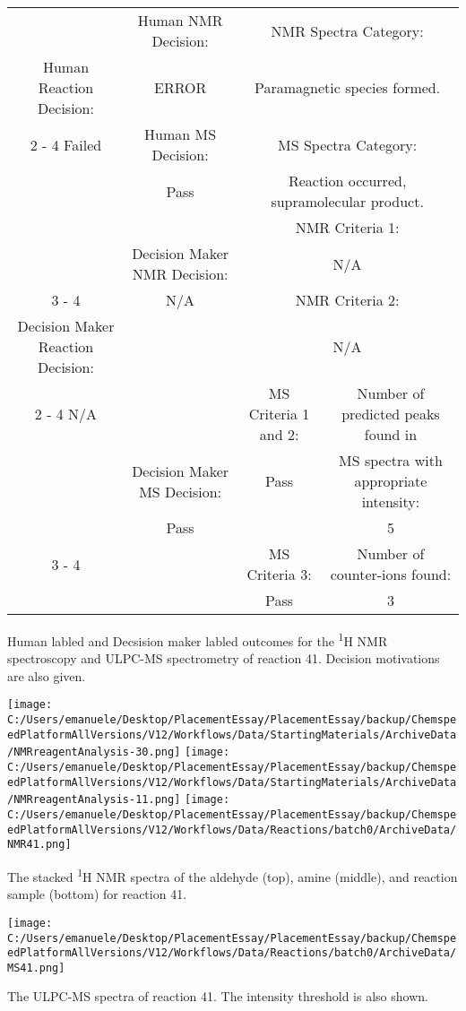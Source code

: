 \documentclass{article}%
\begin{document}
\begin{Decision Table}[H]%
\begin{tabular}{|c|c|c|c|}%
\hline%
&Human NMR Decision:&\multicolumn{2}{|c|}{NMR Spectra Category:}\\%
Human Reaction Decision:&ERROR&\multicolumn{2}{|c|}{Paramagnetic species formed.}\\%
\cline{2%
-%
4}%
Failed&Human MS Decision:&\multicolumn{2}{|c|}{MS Spectra Category:}\\%
&Pass&\multicolumn{2}{|c|}{Reaction occurred, supramolecular product.}\\%
\hline%
&&\multicolumn{2}{|c|}{NMR Criteria 1:}\\%
&Decision Maker NMR Decision:&\multicolumn{2}{|c|}{N/A}\\%
\cline{3%
-%
4}%
&N/A&\multicolumn{2}{|c|}{NMR Criteria 2:}\\%
Decision Maker Reaction Decision:&&\multicolumn{2}{|c|}{N/A}\\%
\cline{2%
-%
4}%
N/A&&MS Criteria 1 and 2:&Number of predicted peaks found in\\%
&Decision Maker MS Decision:&Pass&MS spectra with appropriate intensity:\\%
&Pass&&5\\%
\cline{3%
-%
4}%
&&MS Criteria 3:&Number of counter{-}ions found:\\%
&&Pass&3\\%
\hline%
\end{tabular}%
\caption{Human labled and Decsision maker labled outcomes for the \textsuperscript{1}H NMR spectroscopy and ULPC-MS spectrometry of reaction 41. Decision motivations are also given.}%
\end{Decision Table}%
\begin{NMR Spectra}[H]%
\begin{center}%
\texttt{[image: C:/Users/emanuele/Desktop/PlacementEssay/PlacementEssay/backup/ChemspeedPlatformAllVersions/V12/Workflows/Data/StartingMaterials/ArchiveData/NMRreagentAnalysis-30.png]}\hfill%
\texttt{[image: C:/Users/emanuele/Desktop/PlacementEssay/PlacementEssay/backup/ChemspeedPlatformAllVersions/V12/Workflows/Data/StartingMaterials/ArchiveData/NMRreagentAnalysis-11.png]}\hfill%
\texttt{[image: C:/Users/emanuele/Desktop/PlacementEssay/PlacementEssay/backup/ChemspeedPlatformAllVersions/V12/Workflows/Data/Reactions/batch0/ArchiveData/NMR41.png]}\hfill%
\end{center}%
\caption{The stacked \textsuperscript{1}H NMR spectra of the aldehyde (top), amine (middle), and reaction sample (bottom) for reaction 41.}%
\end{NMR Spectra}%
\begin{MS Spectra}[H]%
\begin{center}%
\texttt{[image: C:/Users/emanuele/Desktop/PlacementEssay/PlacementEssay/backup/ChemspeedPlatformAllVersions/V12/Workflows/Data/Reactions/batch0/ArchiveData/MS41.png]}\hfill%
\end{center}%
\caption{The ULPC-MS spectra of reaction 41. The intensity threshold is also shown.}%
\end{MS Spectra}%
\end{document}
